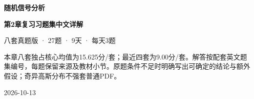 \documentclass[10.5pt,fontset=fandol]{ctexart}
\begin{document}
\begin{titlepage}\centering\vspace*{1.5cm}
{\Huge\bfseries 随机信号分析}\par\vspace{1cm}
{\LARGE\bfseries 第2章复习习题集中文详解}\par\vspace{1cm}
{\large 八套真题版 · 27题 · 9天 · 每天3题}\par\vspace{1cm}
\begin{tcolorbox}[colback=qbg,colframe=navy]
本章八套独占核心均值为15.625分/套；最近四套为9.00分/套。解答按配套英文题集编号，每题保留来源及教材小节。原题条件不足时明确写出可确定的结论与额外假设；奇异高斯分布不强套普通PDF。
\end{tcolorbox}\vfill 2026-10-13\end{titlepage}
\end{document}
